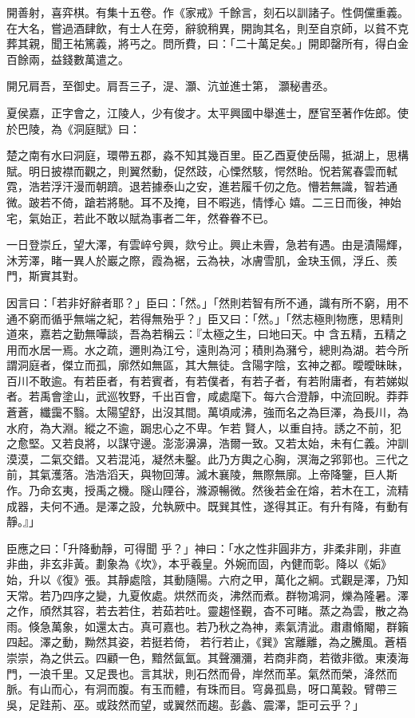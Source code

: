 \begin{pinyinscope}
 開善射，喜弈棋。有集十五卷。作《家戒》千餘言，刻石以訓諸子。性倜儻重義。在大名，嘗過酒肆飲，有士人在旁，辭貌稍異，開詢其名，則至自京師，以貧不克葬其親，聞王祐篤義，將丐之。問所費，曰：「二十萬足矣。」開即罄所有，得白金百餘兩，益錢數萬遣之。



 開兄肩吾，至御史。肩吾三子，湜、灝、沆並進士第，
 灝秘書丞。



 夏侯嘉，正字會之，江陵人，少有俊才。太平興國中舉進士，歷官至著作佐郎。使於巴陵，為《洞庭賦》曰：



 楚之南有水曰洞庭，環帶五郡，淼不知其幾百里。臣乙酉夏使岳陽，抵湖上，思構賦。明日披襟而觀之，則翼然動，促然跂，心慄然駭，愕然眙。怳若駕春雲而軾霓，浩若浮汗漫而朝躋。退若據泰山之安，進若履千仞之危。懵若無識，智若通微。跛若不倚，蹌若將馳。耳不及掩，目不暇逃，情悸心
 嬉。二三日而後，神始宅，氣始正，若此不敢以賦為事者二年，然眷眷不已。



 一日登崇丘，望大澤，有雲崪兮興，欻兮止。興止未霽，急若有遇。由是漬陽輝，沐芳澤，睹一異人於巖之際，霞為裾，云為袂，冰膚雪肌，金玦玉佩，浮丘、羨門，斯實其對。



 因言曰：「若非好辭者耶？」臣曰：「然。」「然則若智有所不通，識有所不窮，用不通不窮而循乎無端之紀，若得無殆乎？」臣又曰：「然。」「然志極則物應，思精則道來，嘉若之勤無嘩談，吾為若稱云：『太極之生，曰地曰天。中
 含五精，五精之用而水居一焉。水之疏，邇則為江兮，遠則為河；積則為瀦兮，總則為湖。若今所謂洞庭者，傑立而孤，廓然如無區，其大無徒。含陽字陰，玄神之都。曖曖昧昧，百川不敢逾。有若臣者，有若賓者，有若僕者，有若子者，有若附庸者，有若娣姒者。若禹會塗山，武巡牧野，千出百會，咸處麾下。每六合澄靜，中流回睨。莽莽蒼蒼，纖靄不翳。太陽望舒，出沒其間。萬頃咸沸，強而名之為巨澤，為長川，為水府，為大淵。縱之不逾，跼忠心之不卑。乍若
 賢人，以重自持。誘之不前，犯之愈堅。又若良將，以謀守邊。澎澎濞濞，浩爾一致。又若太始，未有仁義。沖訓漠漠，二氣交錯。又若混沌，凝然未鑿。此乃方輿之心胸，溟海之郛郭也。三代之前，其氣濩落。浩浩滔天，與物回薄。滅木襄陵，無際無廓。上帝降鑒，巨人斯作。乃命玄夷，授禹之機。隧山陻谷，滌源暢微。然後若金在熔，若木在工，流精成器，夫何不通。是澤之設，允執厥中。既巽其性，遂得其正。有升有降，有動有靜。』」



 臣應之曰：「升降動靜，可得聞
 乎？」神曰：「水之性非圓非方，非柔非剛，非直非曲，非玄非黃。劃象為《坎》，本乎羲皇。外婉而固，內健而彰。降以《姤》始，升以《復》張。其靜處陰，其動隨陽。六府之甲，萬化之綱。式觀是澤，乃知天常。若乃四序之變，九夏攸處。烘然而炎，沸然而煮。群物鴻洞，爍為隆暑。澤之作，頎然其容，若去若住，若茹若吐。靈趨怪覲，杳不可睹。蒸之為雲，散之為雨。倏急萬象，如還太古。真可嘉也。若乃秋之為神，素氣清泚。肅肅翛閹，群籟四起。澤之動，黝然其姿，若挺若倚，
 若行若止，《巽》宮離離，為之騰風。蒼梧崇崇，為之供云。四顧一色，黯然氤氳。其聲瀰瀰，若商非商，若徵非徵。東湊海門，一浪千里。又足畏也。言其狀，則石然而骨，岸然而革。氣然而榮，洚然而脈。有山而心，有洞而腹。有玉而體，有珠而目。穹鼻孤島，呀口萬穀。臂帶三吳，足跬荊、巫。或跂然而望，或翼然而趨。彭蠡、震澤，詎可云乎？」




\end{pinyinscope}
